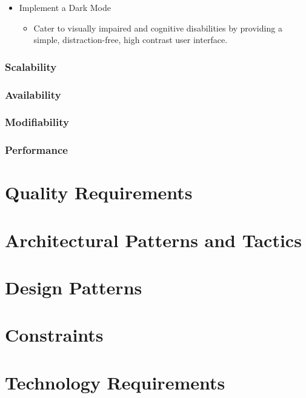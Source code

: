 \documentclass[12pt]{article}
\begin{document}
\begin{itemize}
    \item Implement a Dark Mode
    \begin{itemize}
    \item Cater to visually impaired and cognitive disabilities by providing a simple, distraction-free, high contrast user interface.
    \end{itemize}
\end{itemize}

\subsubsection*{Scalability}

\subsubsection*{Availability}

\subsubsection*{Modifiability}

\subsubsection*{Performance}

  


\newpage

\section{Quality Requirements}

\newpage

\section{Architectural Patterns and Tactics}

\newpage

\section{Design Patterns}

\newpage

\section{Constraints}

\newpage

\section{Technology Requirements}

\newpage
\end{document}
